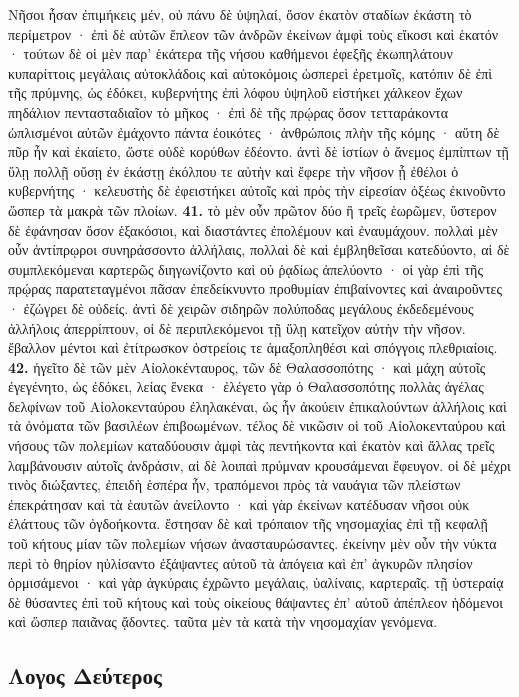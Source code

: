 \documentclass[a4paper, 11pt, oneside, polutonikogreek, german]{article}
\begin{document}
Νῆσοι ἦσαν ἐπιμήκεις μέν, οὐ πάνυ δὲ ὑψηλαί, ὅσον ἑκατὸν σταδίων ἑκάστη τὸ περίμετρον · ἐπὶ δὲ αὐτῶν ἔπλεον τῶν ἀνδρῶν ἐκείνων ἀμφὶ τοὺς εἴκοσι καὶ ἑκατόν · τούτων δὲ οἱ μὲν παρ' ἑκάτερα τῆς νήσου καθήμενοι ἐφεξῆς ἐκωπηλάτουν κυπαρίττοις μεγάλαις αὐτοκλάδοις καὶ αὐτοκόμοις ὡσπερεὶ ἐρετμοῖς, κατόπιν δὲ ἐπὶ τῆς πρύμνης, ὡς ἐδόκει, κυβερνήτης ἐπὶ λόφου ὑψηλοῦ εἱστήκει χάλκεον ἔχων πηδάλιον πεντασταδιαῖον τὸ μῆκος · ἐπὶ δὲ τῆς πρῴρας ὅσον τετταράκοντα ὡπλισμένοι αὐτῶν ἐμάχοντο πάντα ἐοικότες · ἀνθρώποις πλὴν τῆς κόμης · αὕτη δὲ πῦρ ἦν καὶ ἐκαίετο, ὥστε οὐδὲ κορύθων ἐδέοντο. ἀντὶ δὲ ἱστίων ὁ ἄνεμος ἐμπίπτων τῇ ὕλῃ πολλῇ οὔσῃ ἐν ἑκάστῃ ἐκόλπου τε αὐτὴν καὶ ἔφερε τὴν νῆσον ᾗ ἐθέλοι ὁ κυβερνήτης · κελευστὴς δὲ ἐφειστήκει αὐτοῖς καὶ πρὸς τὴν εἰρεσίαν ὀξέως ἐκινοῦντο ὥσπερ τὰ μακρὰ τῶν πλοίων. \textbf{41.} τὸ μὲν οὖν πρῶτον δύο ἢ τρεῖς ἑωρῶμεν, ὕστερον δὲ ἐφάνησαν ὅσον ἑξακόσιοι, καὶ διαστάντες ἐπολέμουν καὶ ἐναυμάχουν. πολλαὶ μὲν οὖν ἀντίπρῳροι συνηράσσοντο ἀλλήλαις, πολλαὶ δὲ καὶ ἐμβληθεῖσαι κατεδύοντο, αἱ δὲ συμπλεκόμεναι καρτερῶς διηγωνίζοντο καὶ οὐ ῥᾳδίως ἀπελύοντο · οἱ γὰρ ἐπὶ τῆς πρῴρας παρατεταγμένοι πᾶσαν ἐπεδείκνυντο προθυμίαν ἐπιβαίνοντες καὶ ἀναιροῦντες · ἐζώγρει δὲ οὐδείς. ἀντὶ δὲ χειρῶν σιδηρῶν πολύποδας μεγάλους ἐκδεδεμένους ἀλλήλοις ἀπερρίπτουν, οἱ δὲ περιπλεκόμενοι τῇ ὕλῃ κατεῖχον αὐτὴν τὴν νῆσον. ἔβαλλον μέντοι καὶ ἐτίτρωσκον ὀστρείοις τε ἁμαξοπληθέσι καὶ σπόγγοις πλεθριαίοις. \textbf{42.} ἡγεῖτο δὲ τῶν μὲν Αἰολοκένταυρος, τῶν δὲ Θαλασσοπότης · καὶ μάχη αὐτοῖς ἐγεγένητο, ὡς ἐδόκει, λείας ἕνεκα · ἐλέγετο γὰρ ὁ Θαλασσοπότης πολλὰς ἀγέλας δελφίνων τοῦ Αἰολοκενταύρου ἐληλακέναι, ὡς ἦν ἀκούειν ἐπικαλούντων ἀλλήλοις καὶ τὰ ὀνόματα τῶν βασιλέων ἐπιβοωμένων. τέλος δὲ νικῶσιν οἱ τοῦ Αἰολοκενταύρου καὶ νήσους τῶν πολεμίων καταδύουσιν ἀμφὶ τὰς πεντήκοντα καὶ ἑκατὸν καὶ ἄλλας τρεῖς λαμβάνουσιν αὐτοῖς ἀνδράσιν, αἱ δὲ λοιπαὶ πρύμναν κρουσάμεναι ἔφευγον. οἱ δὲ μέχρι τινὸς διώξαντες, ἐπειδὴ ἑσπέρα ἦν, τραπόμενοι πρὸς τὰ ναυάγια τῶν πλείστων ἐπεκράτησαν καὶ τὰ ἑαυτῶν ἀνείλοντο · καὶ γὰρ ἐκείνων κατέδυσαν νῆσοι οὐκ ἐλάττους τῶν ὀγδοήκοντα. ἔστησαν δὲ καὶ τρόπαιον τῆς νησομαχίας ἐπὶ τῇ κεφαλῇ τοῦ κήτους μίαν τῶν πολεμίων νήσων ἀνασταυρώσαντες. ἐκείνην μὲν οὖν τὴν νύκτα περὶ τὸ θηρίον ηὐλίσαντο ἐξάψαντες αὐτοῦ τὰ ἀπόγεια καὶ ἐπ' ἀγκυρῶν πλησίον ὁρμισάμενοι · καὶ γὰρ ἀγκύραις ἐχρῶντο μεγάλαις, ὑαλίναις, καρτεραῖς. τῇ ὑστεραίᾳ δὲ θύσαντες ἐπὶ τοῦ κήτους καὶ τοὺς οἰκείους θάψαντες ἐπ' αὐτοῦ ἀπέπλεον ἡδόμενοι καὶ ὥσπερ παιᾶνας ᾄδοντες. ταῦτα μὲν τὰ κατὰ τὴν νησομαχίαν γενόμενα.
\clearpage
\begin{center}
\section{Λογος Δεύτερος}
\end{center}
\end{document}
